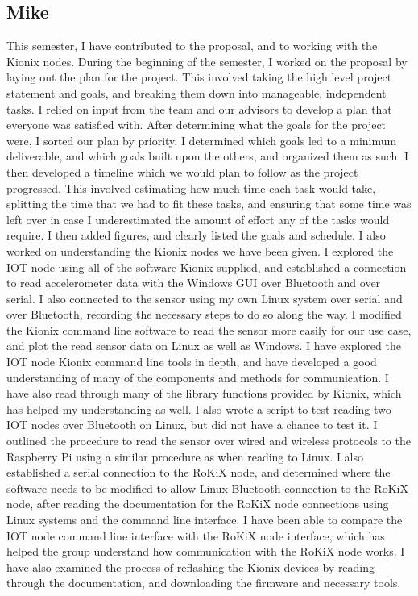 \documentclass[11pt, a4paper]{article}
\begin{document}
\subsection{Mike}

This semester, I have contributed to the proposal, and to working with the Kionix nodes. During the beginning of the semester, I worked on the proposal by laying out the plan for the project. This involved taking the high level project statement and goals, and breaking them down into manageable, independent tasks. I relied on input from the team and our advisors to develop a plan that everyone was satisfied with. After determining what the goals for the project were, I sorted our plan by priority. I determined which goals led to a minimum deliverable, and which goals built upon the others, and organized them as such. I then developed a timeline which we would plan to follow as the project progressed. This involved estimating how much time each task would take, splitting the time that we had to fit these tasks, and ensuring that some time was left over in case I underestimated the amount of effort any of the tasks would require. I then added figures, and clearly listed the goals and schedule. 
I also worked on understanding the Kionix nodes we have been given. I explored the IOT node using all of the software Kionix supplied, and established a connection to read accelerometer data with the Windows GUI over Bluetooth and over serial. I also connected to the sensor using my own Linux system over serial and over Bluetooth, recording the necessary steps to do so along the way. I modified the Kionix command line software to read the sensor more easily for our use case, and plot the read sensor data on Linux as well as Windows. I have explored the IOT node Kionix command line tools in depth, and have developed a good understanding of many of the components and methods for communication. I have also read through many of the library functions provided by Kionix, which has helped my understanding as well. I also wrote a script to test reading two IOT nodes over Bluetooth on Linux, but did not have a chance to test it. I outlined the procedure to read the sensor over wired and wireless protocols to the Raspberry Pi using a similar procedure as when reading to Linux. I also established a serial connection to the RoKiX node, and determined where the software needs to be modified to allow Linux Bluetooth connection to the RoKiX node, after reading the documentation for the RoKiX node connections using Linux systems and the command line interface. I have been able to compare the IOT node command line interface with the RoKiX node interface, which has helped the group understand how communication with the RoKiX node works. I have also examined the process of reflashing the Kionix devices by reading through the documentation, and downloading the firmware and necessary tools.
\end{document}

